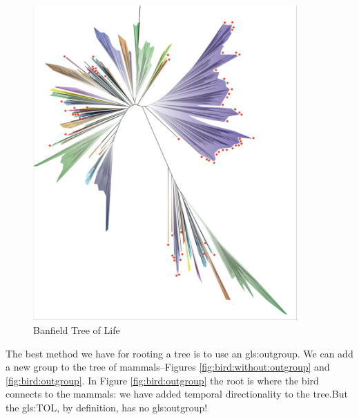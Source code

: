 \documentclass[]{article}
\begin{document}
\begin{figure}[H]
	\caption[Banfield Tree of Life]{Banfield Tree of Life\cite{hug2016new}}\label{fig:banfield:tol}
	\includegraphics[width=0.9\textwidth]{TOL4}
\end{figure}

The best method we have for rooting a tree is to use an \gls{gls:outgroup}. We can add a new group to the tree of mammals--Figures \ref{fig:bird:without:outgroup} and \ref{fig:bird:outgroup}. In Figure \ref{fig:bird:outgroup} the root is where the bird connects to the mammals: we have added temporal directionality to the tree.But the \gls{gls:TOL}, by definition, has no \gls{gls:outgroup}!
\end{document}
